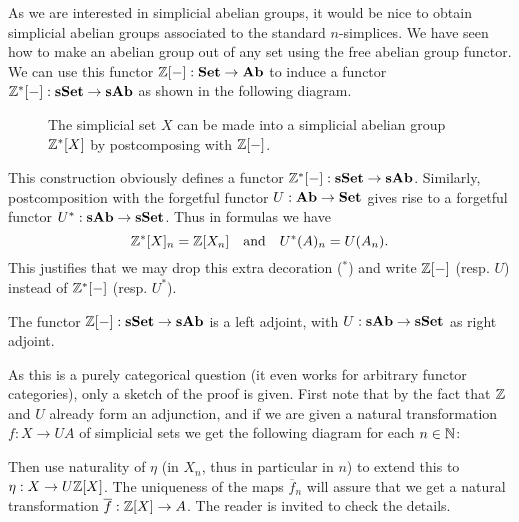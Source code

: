 As we are interested in simplicial abelian groups, it would be nice to obtain simplicial abelian groups associated to the standard $n$-simplices. We have seen how to make an abelian group out of any set using the free abelian group functor. We can use this functor $\mathbb{Z}[-]: \mathbf{Set} \to \mathbf{Ab}$ to induce a functor $\mathbb{Z}^\ast[-]: \mathbf{sSet} \to \mathbf{sAb}$ as shown in the following diagram.
\begin{figure}[h!]
	\caption{The simplicial set $X$ can be made into a simplicial abelian group $\mathbb{Z}^\ast[X]$ by postcomposing with $\mathbb{Z}[-]$.}
	\label{fig:diagram_Z}
\end{figure}
This construction obviously defines a functor $\mathbb{Z}^\ast[-] : \mathbf{sSet} \to \mathbf{sAb}$. Similarly, postcomposition with the forgetful functor $U: \mathbf{Ab} \to \mathbf{Set}$ gives rise to a forgetful functor $U^\ast: \mathbf{sAb} \to \mathbf{sSet}$. Thus in formulas we have
$$ \mathbb{Z}^\ast[X]_n = \mathbb{Z}[X_n] \quad\text{and}\quad U^\ast(A)_n = U(A_n). $$
This justifies that we may drop this extra decoration ($^\ast$) and write $\mathbb{Z}[-]$ (resp. $U$) instead of $\mathbb{Z}^\ast[-]$ (resp. $U^\ast$).

\begin{lemma}
	The functor $\mathbb{Z}[-]: \mathbf{sSet} \to \mathbf{sAb}$ is a left adjoint, with $U: \mathbf{sAb} \to \mathbf{sSet}$ as right adjoint.
\end{lemma}
As this is a purely categorical question (it even works for arbitrary functor categories), only a sketch of the proof is given. First note that by the fact that $\mathbb{Z}$ and $U$ already form an adjunction, and if we are given a natural transformation $f: X \to UA$ of simplicial sets we get the following diagram for each $n \in \mathbb{N}$:
\begin{center}
\end{center}
Then use naturality of $\eta$ (in $X_n$, thus in particular in $n$) to extend this to $\eta : X \to U\mathbb{Z}[X]$. The uniqueness of the maps $\overline{f}_n$ will assure that we get a natural transformation $\overline{f}: \mathbb{Z}[X] \to A$. The reader is invited to check the details.


